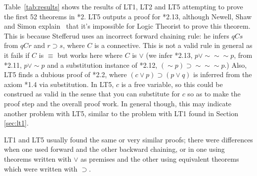 \documentclass[journal]{IEEEtran}
\begin{document}
Table~\ref{tab:results} shows the results of LT1, LT2 and LT5
attempting to prove the first 52 theorems in *2. 
LT5 outputs a proof for *2.13, although Newell, Shaw and Simon
explain~\cite[p.~222]{LT1957} that it's impossible for Logic 
Theorist to prove this theorem.  This is because Stefferud uses
an incorrect forward chaining rule: he infers $q C s$ from
$q C r$ and $r\supset s$, where $C$ is a connective.  This 
is not a valid rule in general as it fails if $C$ is $\equiv$
but works here where $C$ is $\vee$
(we infer *2.13, $p \vee \sim \sim \sim p$, from 
*2.11, $p \vee \sim p$
and a substitution instance of *2.12,
$(\sim p) \supset \sim \sim \sim p$.)
Also, LT5 finds a dubious proof of *2.2, where
$(c\vee p)\supset(p\vee q)$ is inferred from the axiom *1.4 via 
substitution.  In LT5, $c$ is a free variable,
so this could be construed as valid in the sense that you can
substitute for $c$ so as to make the proof step and the overall
proof work.  In general though, this may indicate another problem with LT5,
similar to the problem with LT1 found in Section \ref{sec:lt1}.

LT1 and LT5 usually found the same or very similar proofs;
there were differences when one used forward and the other
backward chaining, or in one using theorems written with $\vee$ as premises
and the other using equivalent theorems which were written with $\supset$.

\def\Y{$+$}
\def\N{$-$}
\end{document}
